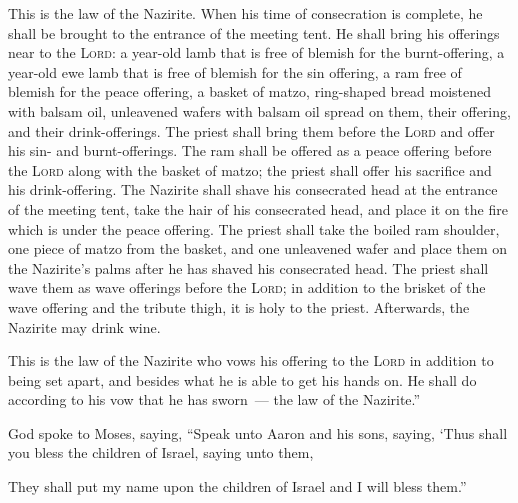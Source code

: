 \begin{inparaenum}
   This is the law of the Nazirite. When his time of consecration is complete, he shall be brought to the entrance of the meeting tent.%
   He shall bring his offerings near to the \textsc{Lord}: a year-old lamb that is free of blemish for the burnt-offering, a year-old ewe lamb that is free of blemish for the sin offering, a ram free of blemish for the peace offering,%
   a basket of matzo, ring-shaped bread moistened with balsam oil, unleavened wafers with balsam oil spread on them, their offering, and their drink-offerings.%
   The priest shall bring them before the \textsc{Lord} and offer his sin- and burnt-offerings.%
   The ram shall be offered as a peace offering before the \textsc{Lord} along with the basket of matzo; the priest shall offer his sacrifice and his drink-offering.%
   The Nazirite shall shave his consecrated head at the entrance of the meeting tent, take the hair of his consecrated head, and place it on the fire which is under the peace offering.%
   The priest shall take the boiled ram shoulder, one piece of matzo from the basket, and one unleavened wafer and place them on the Nazirite's palms after he has shaved his consecrated head.%
   The priest shall wave them as wave offerings before the \textsc{Lord}; in addition to the brisket of the wave offering and the tribute thigh, it is holy to the priest. Afterwards, the Nazirite may drink wine.%
  
   This is the law of the Nazirite who vows his offering to the \textsc{Lord} in addition to being set apart, and besides what he is able to get his hands on. He shall do according to his vow that he has sworn~--- the law of the Nazirite.''%
  
   God spoke to Moses, saying,%
   ``Speak unto Aaron and his sons, saying, `Thus shall you bless the children of Israel, saying unto them,%
  
  
  
  
   They shall put my name upon the children of Israel and I will bless them.''%
\end{inparaenum}
